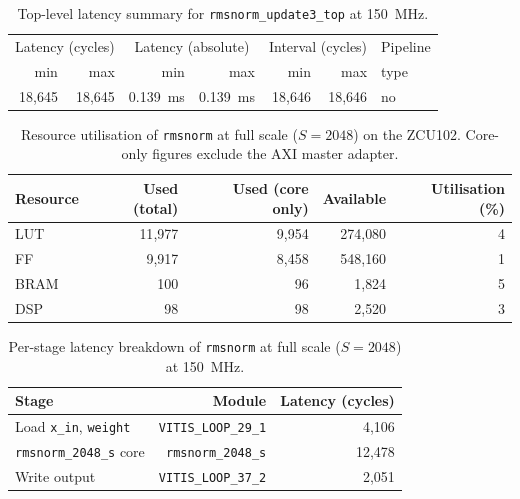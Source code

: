 \begin{table}[H]
  \centering
  \begin{tabular}{rrrrrrl}
    \toprule
    \multicolumn{2}{c}{Latency (cycles)} &
    \multicolumn{2}{c}{Latency (absolute)} &
    \multicolumn{2}{c}{Interval (cycles)} & Pipeline \\
    min & max & min & max & min & max & type \\
    \midrule
    18{,}645 & 18{,}645 & \SI{0.139}{\milli\second} & \SI{0.139}{\milli\second} & 18{,}646 & 18{,}646 & no \\
    \bottomrule
  \end{tabular}
  \caption{Top-level latency summary for \texttt{rmsnorm\_update3\_top}
           at \SI{150}{\mega\hertz}.}
  \label{tab:rmsnorm_u3_top_latency}
\end{table}

\begin{table}[H]
  \centering
  \begin{tabular}{lrrrr}
    \toprule
    Resource & Used (total) & Used (core only) & Available & Utilisation (\%) \\
    \midrule
    LUT  & 11{,}977 &  9{,}954 & 274{,}080 &  4 \\
    FF   &  9{,}917 &  8{,}458 & 548{,}160 &  1 \\
    BRAM &      100 &       96 &   1{,}824 &  5 \\
    DSP  &       98 &       98 &   2{,}520 &  3 \\
    \bottomrule
  \end{tabular}
  \caption{Resource utilisation of \texttt{rmsnorm} at full scale
           ($S = 2048$) on the ZCU102. Core-only figures exclude the
           AXI master adapter.}
  \label{tab:rmsnorm_u3_resources}
\end{table}

\begin{table}[H]
  \centering
  \begin{tabular}{lrr}
    \toprule
    Stage & Module & Latency (cycles) \\
    \midrule
    Load \texttt{x\_in}, \texttt{weight} & \texttt{VITIS\_LOOP\_29\_1} &  4{,}106 \\
    \texttt{rmsnorm\_2048\_s} core       & \texttt{rmsnorm\_2048\_s}   & 12{,}478 \\
    Write output                         & \texttt{VITIS\_LOOP\_37\_2} &  2{,}051 \\
    \bottomrule
  \end{tabular}
  \caption{Per-stage latency breakdown of \texttt{rmsnorm} at full scale
           ($S = 2048$) at \SI{150}{\mega\hertz}.}
  \label{tab:rmsnorm_u3_latency}
\end{table}

